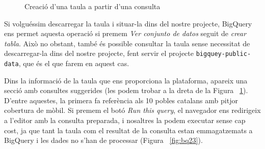 \documentclass[12pt,longbibliography]{article}
\theoremstyle{definition}
\theoremstyle{remark}
\begin{document}
\begin{figure}[h!]
\par
{}%
\hfill
{}%
\par

\caption{Creació d'una taula a partir d'una consulta}
\label{fig:bq21}
\end{figure}


Si volguéssim descarregar la taula i situar-la dins del nostre projecte, BigQuery ens permet aquesta operació si premem \textit{Ver conjunto de datos} seguit de \textit{crear tabla}. Això no obstant, també és possible consultar la taula sense necessitat de descarregar-la dins del nostre projecte, fent servir el projecte \verb|bigquey-public-data|, que és el que farem en aquest cas.



Dins la informació de la taula que ens proporciona la plataforma, apareix una secció amb consultes suggerides (les podem trobar a la dreta de la Figura ~\ref{fig:bq21}). D'entre aquestes, la primera fa referència als 10 pobles catalans amb pitjor cobertura de mòbil.  Si premem el botó \textit{Run this query}, el navegador ens redirigeix a l'editor amb la consulta preparada, i nosaltres la podem executar sense cap cost, ja que tant la taula com el resultat de la consulta estan emmagatzemats a BigQuery i les dades no s'han de processar (Figura ~\ref{fig:bq23}).
\end{document}
